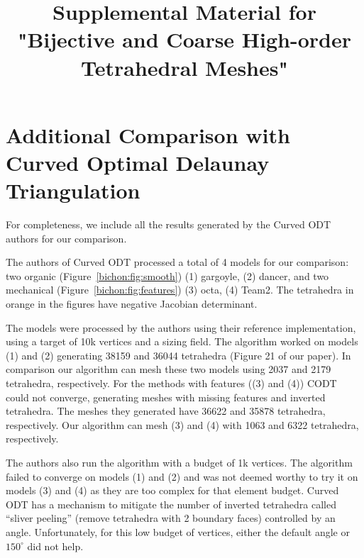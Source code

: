 \documentclass[acmtog,anonymous,review]{acmart}
\date{}
\title{Supplemental Material for "Bijective and Coarse High-order Tetrahedral Meshes"}
\begin{document}
\maketitle

\section*{Additional Comparison with Curved Optimal Delaunay Triangulation}

For completeness, we include all the results generated by the Curved ODT authors for our comparison. 

The authors of Curved ODT processed a total of 4 models for our comparison: two organic (Figure~\ref{bichon:fig:smooth}) (1) gargoyle, (2) dancer, and two mechanical (Figure~\ref{bichon:fig:features}) (3) octa, (4) Team2. The tetrahedra in orange in the figures have negative Jacobian determinant.

The models were processed by the authors using their reference implementation, using a target of 10k vertices and a sizing field. The algorithm worked on models (1) and (2) generating 38159 and 36044 tetrahedra (Figure 21 of our paper). In comparison our algorithm can mesh these two models using 2037 and 2179 tetrahedra, respectively. For the methods with features ((3) and (4)) CODT could not converge, generating meshes with missing features and inverted tetrahedra. The meshes they generated have 
 36622 and 35878 tetrahedra, respectively.
Our algorithm can mesh (3) and (4) with 1063 and 6322 tetrahedra, respectively.

The authors also run the algorithm with a budget of 1k vertices. The algorithm failed to converge on models (1) and (2) and was not deemed worthy to try it on models (3) and (4) as they are too complex for that element budget. Curved ODT has a mechanism to mitigate the number of inverted tetrahedra called ``sliver peeling'' (remove tetrahedra with 2 boundary faces) controlled by an angle. Unfortunately, for this low budget of vertices, either the default angle or $150^\circ$ did not help.

\end{document}
